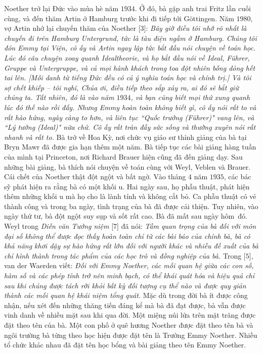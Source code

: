 \begin{multicols}{2}
	\vskip 0.05cm
	Noether trở lại Đức vào mùa hè năm $1934$. Ở đó, bà gặp anh trai Fritz lần cuối cùng, và đến thăm Artin ở Hamburg trước khi đi tiếp tới Göttingen. Năm $1980$, vợ Artin nhớ lại chuyến thăm của Noether [$3$]:
	\vskip 0.05cm
	\textit{Bây giờ điều tôi nhớ rõ nhất là chuyến đi trên Hamburg Untergrund, tức là tàu điện ngầm ở Hamburg. Chúng tôi đón Emmy tại Viện, cô ấy và Artin ngay lập tức bắt đầu nói chuyện về toán học. Lúc đó câu chuyện xoay quanh Idealtheorie, và họ bắt đầu nói về Ideal, Führer, Gruppe và Untergruppe, và cả mọi hành khách trong toa  đột nhiên bỗng dỏng hết tai lên. [Mỗi danh từ tiếng Đức đều có cả ý nghĩa toán học và chính trị.] Và tôi sợ chết khiếp -- tôi nghĩ, Chúa ơi, điều tiếp theo sắp xảy ra, ai đó sẽ bắt giữ chúng ta. Tất nhiên, đó là vào năm $1934$, và bạn cũng biết mọi thứ xung quanh lúc đó thế nào rồi đấy. Nhưng Emmy hoàn toàn không biết gì, cô ấy nói rất to và rất hào hứng, ngày càng to hơn, và liên tục ``Quốc trưởng (Führer)" vang lên, và ``Lý tưởng (Ideal)" nữa chứ. Cô ấy rất tràn đầy sức sống và thường xuyên nói rất nhanh và rất to.}
	\vskip 0.05cm
	Bà trở về Hoa Kỳ, nơi chức vụ giáo sư thỉnh giảng của bà tại Bryn Mawr đã được gia hạn thêm một năm. Bà  tiếp tục các bài giảng hàng tuần của mình tại Princeton, nơi Richard Brauer hiện cũng đã đến giảng dạy. Sau những bài giảng, bà thích nói chuyện về toán cùng với Weyl, Veblen và Brauer.
	\vskip 0.05cm
	Cái chết của Noether thật đột ngột và bất ngờ. Vào tháng $4$ năm $1935$, các bác sỹ phát hiện ra rằng bà có một khối u. Hai ngày sau, họ phẫu thuật, phát hiện thêm những khối u mà họ cho là lành tính và không cắt bỏ. Ca phẫu thuật có vẻ thành công và trong ba ngày, tình trạng của bà đã được cải thiện. Tuy nhiên, vào ngày thứ tư, bà đột ngột suy sụp và sốt rất cao. Bà đã mất sau ngày hôm~đó.
	\vskip 0.05cm
	Weyl trong \textit{Diễn văn Tưởng niệm} [$7$] đã nói:
	\vskip 0.05cm
	\textit{Tầm quan trọng của bà đối với môn đại số không thể được đọc thấy hoàn toàn chỉ từ các bài báo của chính bà, bà có khả năng khơi dậy sự hào hứng rất lớn đối với người khác và nhiều đề xuất của bà chỉ hình thành trong tác phẩm của các học trò và đồng nghiệp của bà.}
	\vskip 0.05cm
	Trong [$5$], van der Waerden viết:
	\vskip 0.05cm
	\textit{Đối với Emmy Noether, các mối quan hệ giữa các con số, hàm số và các phép tính trở nên minh bạch, có thể khái quát hóa và hiệu quả chỉ sau khi chúng được tách rời khỏi bất kỳ đối tượng cụ thể nào và được quy giản thành các mối quan hệ khái niệm tổng quát.}
	\vskip 0.05cm
	Mặc dù trong đời bà ít được công nhận, nếu xét đến những thăng tiến đáng kể mà bà đã đạt được, bà vẫn được vinh danh về nhiều mặt sau khi qua đời. Một miệng núi lửa trên mặt trăng được đặt theo tên của bà. Một con phố ở quê hương Noether được đặt theo tên bà và ngôi trường bà từng theo học hiện được đặt tên là Trường Emmy Noether. Nhiều tổ chức khác nhau đã đặt tên học bổng và bài giảng theo tên Emmy Noether.

\end{multicols}
